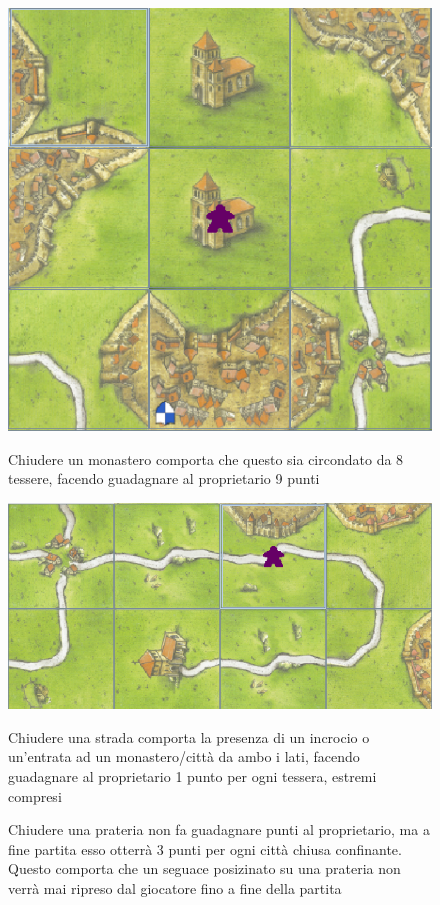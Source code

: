 \begin{figure}[hb]
    {\includegraphics[]{images/MonasteroMeeple.png}}

    \caption{Chiudere un monastero comporta che questo sia circondato da 8 tessere, facendo guadagnare al proprietario 9 punti}
\end{figure}

\begin{figure}[hb]
    {\includegraphics[]{images/StradaMeeple.png}}

    \caption{Chiudere una strada comporta la presenza di un incrocio o un’entrata ad un monastero/città da ambo i lati, facendo guadagnare al proprietario 1 punto per ogni tessera, estremi compresi}
\end{figure}

\begin{figure}[hb]

    \caption{Chiudere una prateria non fa guadagnare punti al proprietario, ma a fine partita esso otterrà 3 punti per ogni città chiusa confinante. Questo comporta che un seguace posizinato su una prateria non verrà mai ripreso dal giocatore fino a fine della partita}
\end{figure}

